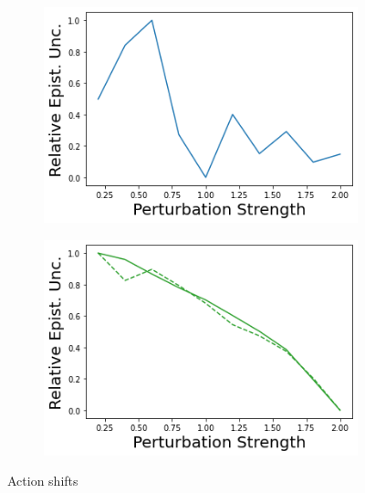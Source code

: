 \begin{figure}
\begin{subfigure}{.24\textwidth}
        \includegraphics[width=\textwidth]{sections/011_icml2022/resources/action_shift-DKL-AcrobotShift-v0-mean_epistemic_uncertainty_.png}
    \end{subfigure}
    \begin{subfigure}{.24\textwidth}
        \includegraphics[width=\textwidth]{sections/011_icml2022/resources/action_shift-PostNet-AcrobotShift-v0-mean_epistemic_uncertainty_.png}
    \end{subfigure}
    \vspace{-3mm}
    \caption*{Action shifts}
    \vspace{2mm}


\end{figure}
